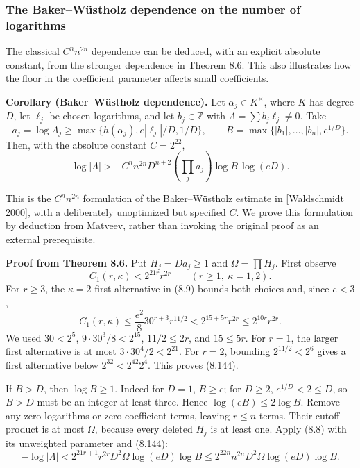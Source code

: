 \documentclass[
  11pt,
  a4paper,
]{article}
\begin{document}
\subsubsection{The Baker--Wüstholz dependence on the number of
logarithms}\label{the-bakerwuxfcstholz-dependence-on-the-number-of-logarithms}

The classical \(C^n n^{2n}\) dependence can be deduced, with an explicit
absolute constant, from the stronger dependence in Theorem 8.6. This
also illustrates how the floor in the coefficient parameter affects
small coefficients.

\textbf{Corollary (Baker--Wüstholz dependence).} Let
\(\alpha_j\in K^\times\), where \(K\) has degree \(D\), let \(\ell_j\)
be chosen logarithms, and let \(b_j\in\mathbb Z\) with
\(\Lambda=\sum b_j\ell_j\ne0\). Take \[
a_j=\log A_j\ge
\max\{h(\alpha_j),e|\ell_j|/D,1/D\},\qquad
B=\max\{|b_1|,\ldots,|b_n|,e^{1/D}\}.
\] Then, with the absolute constant \(C=2^{22}\), \[
\log|\Lambda|>
-C^n n^{2n}D^{n+2}
\left(\prod_j a_j\right)\log B\,\log(eD). \tag{8.143}
\]

This is the \(C^n n^{2n}\) formulation of the Baker--Wüstholz estimate
in {[}Waldschmidt 2000{]}, with a deliberately unoptimized but specified
\(C\). We prove this formulation by deduction from Matveev, rather than
invoking the original proof as an external prerequisite.

\textbf{Proof from Theorem 8.6.} Put \(H_j=D a_j\ge1\) and
\(\Omega=\prod H_j\). First observe \[
C_1(r,\kappa)<2^{21r}r^{2r}\qquad(r\ge1,\ \kappa=1,2). \tag{8.144}
\] For \(r\ge3\), the \(\kappa=2\) first alternative in (8.9) bounds
both choices and, since \(e<3\), \[
C_1(r,\kappa)
\le\frac{e^2}{8}30^{r+3}r^{11/2}
<2^{15+5r}r^{2r}\le2^{10r}r^{2r}.
\] We used \(30<2^5\), \(9\cdot30^3/8<2^{15}\), \(11/2\le2r\), and
\(15\le5r\). For \(r=1\), the larger first alternative is at most
\(3\cdot30^4/2<2^{21}\). For \(r=2\), bounding \(2^{11/2}<2^6\) gives a
first alternative below \(2^{32}<2^{42}2^4\). This proves (8.144).

If \(B>D\), then \(\log B\ge1\). Indeed for \(D=1\), \(B\ge e\); for
\(D\ge2\), \(e^{1/D}<2\le D\), so \(B>D\) must be an integer at least
three. Hence \(\log(eB)\le2\log B\). Remove any zero logarithms or zero
coefficient terms, leaving \(r\le n\) terms. Their cutoff product is at
most \(\Omega\), because every deleted \(H_j\) is at least one. Apply
(8.8) with its unweighted parameter and (8.144): \[
-\log|\Lambda|<
2^{21r+1}r^{2r}D^2\Omega\log(eD)\log B
\le2^{22n}n^{2n}D^2\Omega\log(eD)\log B.
\]
\end{document}
